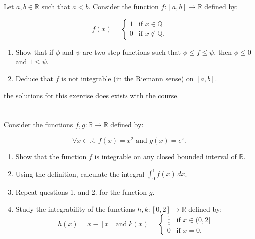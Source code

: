 \documentclass[12pt]{article}
\begin{document}
\section{}
Let $a, b \in \mathbb{R}$ such that $a < b$. Consider the function $f: [a, b] \rightarrow \mathbb{R}$ defined by:

\[
	f(x) =
	\begin{cases}
		1 & \text{if } x \in \mathbb{Q}     \\
		0 & \text{if } x \notin \mathbb{Q}.
	\end{cases}
\]

\begin{enumerate}
	\item Show that if $\phi$ and $\psi$ are two step functions such that $\phi \leq f \leq \psi$, then $\phi \leq 0$ and $1 \leq \psi$.
	\item Deduce that $f$ is not integrable (in the Riemann sense) on $[a, b]$.
\end{enumerate}

\begin{correctionbox}
	the solutions for this exercise does exists with the course.
\end{correctionbox}

\section{}
Consider the functions $f, g: \mathbb{R} \rightarrow \mathbb{R}$ defined by:

\[
	\forall x \in \mathbb{R}, \, f(x) = x^2 \text{ and } g(x) = e^x.
\]

\begin{enumerate}
	\item Show that the function $f$ is integrable on any closed bounded interval of $\mathbb{R}$.
	\item Using the definition, calculate the integral $\int_0^1 f(x) \, dx$.
	\item Repeat questions 1. and 2. for the function $g$.
	\item Study the integrability of the functions $h, k: [0, 2] \rightarrow \mathbb{R}$ defined by:
	      \[
		      h(x) = x - [x] \text{ and } k(x) =
		      \begin{cases}
			      \frac{1}{x} & \text{if } x \in (0, 2] \\
			      0           & \text{if } x = 0.
		      \end{cases}
	      \]
\end{enumerate}
\end{document}
